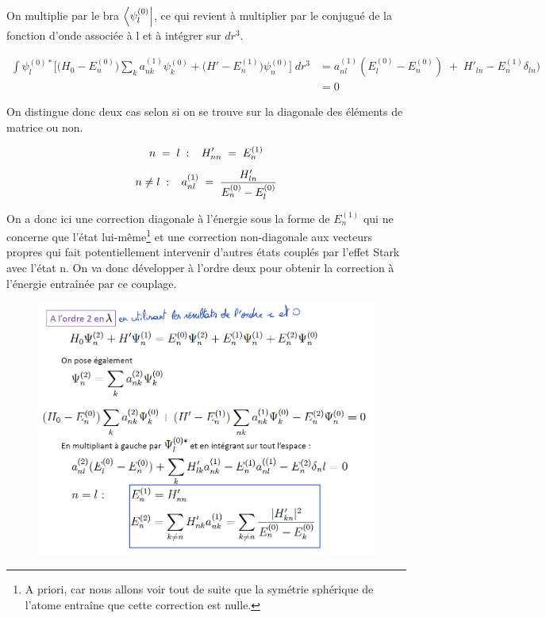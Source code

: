 On multiplie par le bra $\bra{\psi^{(0)}_l}$, ce qui revient à multiplier par le conjugué de la fonction d'onde associée à l et à intégrer sur $dr^3$.

\begin{align*}
    \int \psi^{(0)*}_l\Big[ \Big(H_0 - E^{(0)}_n\Big)\sum_k a_{nk}^{(1)} \psi_k^{(0)} + \Big(H' - E^{(1)}_n\Big)\psi_n^{(0)}\Big] \;dr^3 &= a^{(1)}_{nl}(E^{(0)}_l-E^{(0)}_n) \;+\; H'_{ln} - E^{(1)}_n\delta_{ln})\\
    &= 0
\end{align*}

On distingue donc deux cas selon si on se trouve sur la diagonale des éléments de matrice ou non.

\begin{equation*}
    n \; = \;  l\;:\;\;\; H'_{nn} \; = \; E^{(1)}_n
\end{equation*}
\begin{equation*}
    n \neq l\;:\;\;\; a^{(1)}_{nl} \; = \; \dfrac{H'_{ln}}{E^{(0)}_n-E^{(0)}_l}
\end{equation*}

On a donc ici une correction diagonale à l'énergie sous la forme de $E^{(1)}_n$ qui ne concerne que l'état lui-même\footnote{A priori, car nous allons voir tout de suite que la symétrie sphérique de l'atome entraîne que cette correction est nulle.} et une correction non-diagonale aux vecteurs propres qui fait potentiellement intervenir d'autres états couplés par l'effet Stark avec l'état n. On va donc développer à l'ordre deux pour obtenir la correction à l'énergie entraînée par ce couplage.\\

\begin{figure}[tph]
    \centering
    \includegraphics[scale=0.65]{Images2/ordre2.1.PNG}
\end{figure}

